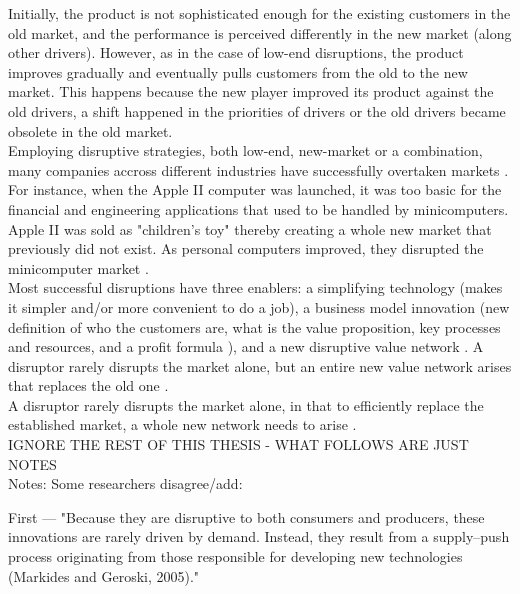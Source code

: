 \documentclass[a4paper,10pt]{book}
\begin{document}
Initially, the product is not sophisticated enough for the existing customers in the old market, 
and the performance is perceived differently in the new market (along other drivers). 
However, as in the case of low-end disruptions, the product improves
gradually and eventually pulls customers from the old to the new market. This happens because the new player improved its 
product against the old drivers, a shift happened in the priorities of drivers or the old drivers became obsolete in the old market.\\

Employing disruptive strategies, both low-end, new-market or a combination, many companies accross different industries 
have successfully overtaken markets \cite{innovatorsSolution}. For instance, when the Apple II computer was launched, it was too basic 
for the financial and engineering applications that used to be handled by minicomputers. Apple II was sold as "children's toy" thereby 
creating a whole new market that previously did not exist. 
As personal computers improved, they disrupted the minicomputer market \cite{disruptionInEducation}. 
\\

Most successful disruptions have three enablers: 
a simplifying technology (makes it simpler and/or more convenient to do a job), a business model innovation (new definition of who the customers are, 
what is the value proposition, key processes and resources, and a profit formula \cite{reinvetingBusinessModel}), and a new disruptive 
value network \cite{pressArticleHbsReviveHealthCareInnovation}. A disruptor rarely disrupts the market alone, but an entire new value 
network arises that replaces the old one \cite{DisruptingClassExpandedEdition}\cite{pressArticleHbsReviveHealthCareInnovation}. 
\\
A disruptor rarely disrupts the market alone, in that to efficiently replace 
the established market, a whole new network needs to arise \cite{DisruptingClassExpandedEdition}\cite{pressArticleHbsReviveHealthCareInnovation}. 
\\

IGNORE THE REST OF THIS THESIS - WHAT FOLLOWS ARE JUST NOTES 
\\



Notes:
Some researchers disagree/add:

First \cite{scientificArticleDisruptiveInnovationBetterTheory}
---
"Because they are disruptive to both consumers and
producers, these innovations are rarely driven by
demand. Instead, they result from a supply–push
process originating from those responsible for
developing new technologies (Markides and Geroski,
2005)." \cite{scientificArticleDisruptiveInnovationBetterTheory}
\end{document}
